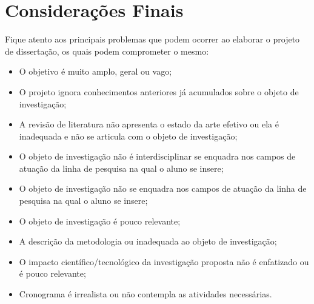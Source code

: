 \chapter{Considerações Finais}
Fique atento aos principais problemas que podem ocorrer ao elaborar o projeto de dissertação, os quais podem comprometer o mesmo: 
\begin{itemize}
\item	O objetivo é muito amplo, geral ou vago;
\item	O projeto ignora conhecimentos anteriores já acumulados sobre o objeto de investigação;
\item	A revisão de literatura não apresenta o estado da arte efetivo ou ela é inadequada e não se articula com o objeto de investigação;
\item	O objeto de investigação não é interdisciplinar se enquadra nos campos de atuação da linha de pesquisa na qual o aluno se insere; 
\item	O objeto de investigação não se enquadra nos campos de atuação da linha de pesquisa na qual o aluno se insere; 
\item	O objeto de investigação é pouco relevante;
\item	A descrição da metodologia ou  inadequada ao objeto de investigação;  
\item	O impacto científico/tecnológico da investigação proposta não é enfatizado ou é pouco relevante; 
\item	Cronograma é irrealista ou não contempla as atividades necessárias.
\end{itemize}  
